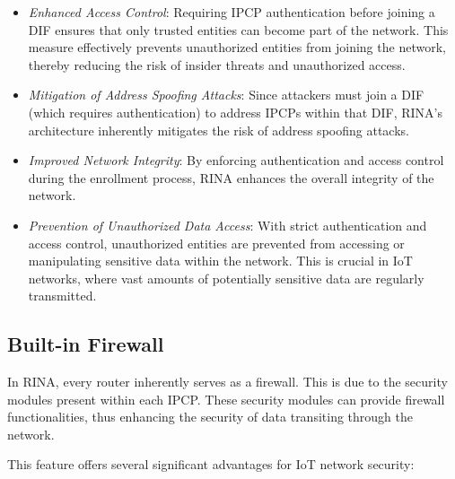 \documentclass{ieeeaccess}
\begin{document}
\begin{itemize}
	\item \textit{Enhanced Access Control}: Requiring IPCP authentication before joining a DIF ensures that only trusted entities can become part of the network. This measure effectively prevents unauthorized entities from joining the network, thereby reducing the risk of insider threats and unauthorized access.
	\item \textit{Mitigation of Address Spoofing Attacks}: Since attackers must join a DIF (which requires authentication) to address IPCPs within that DIF, RINA's architecture inherently mitigates the risk of address spoofing attacks. 
	\item \textit{Improved Network Integrity}: By enforcing authentication and access control during the enrollment process, RINA enhances the overall integrity of the network.
	\item \textit{Prevention of Unauthorized Data Access}: With strict authentication and access control, unauthorized entities are prevented from accessing or manipulating sensitive data within the network. This is crucial in IoT networks, where vast amounts of potentially sensitive data are regularly transmitted.
\end{itemize}

\subsection{Built-in Firewall}

In RINA, every router inherently serves as a firewall. This is due to the security modules present within each IPCP. These security modules can provide firewall functionalities, thus enhancing the security of data transiting through the network.

This feature offers several significant advantages for IoT network security:
\end{document}
